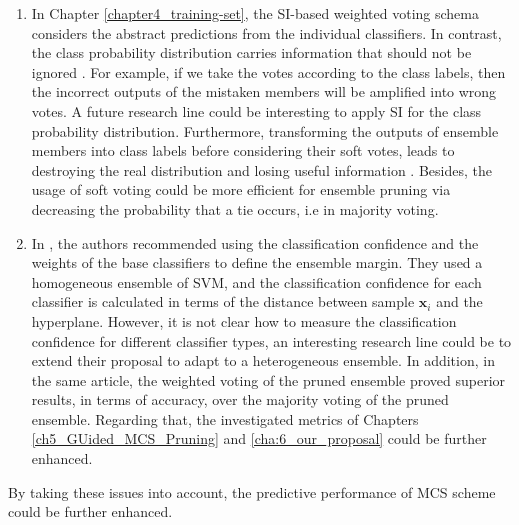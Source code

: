 \begin{enumerate}
    \item In Chapter \ref{chapter4_training-set}, the SI-based weighted voting schema considers the abstract predictions from the individual classifiers. In contrast, the class probability distribution carries information that should not be ignored \cite{sikora2015}. For example, if we take the votes according to the class labels, then the incorrect outputs of the mistaken members will be amplified into wrong votes. A future research line could be interesting to apply SI for the class probability distribution. Furthermore, transforming the outputs of ensemble members into class labels before considering their soft votes, leads to destroying the real distribution and losing useful information \cite{dai2015}.  Besides, the usage of soft voting could be more efficient for ensemble pruning via decreasing the probability that a tie occurs, i.e in majority voting. 
    \item In \cite{li2014}, the authors recommended using the classification confidence and the weights of the base classifiers to define the ensemble margin. They used a homogeneous ensemble of SVM, and the classification confidence for each classifier is calculated in terms of the distance between sample $\textbf{x}_i$ and the hyperplane. However, it is not clear how to measure the classification confidence for different classifier types, an interesting research line could be to extend their proposal to adapt to a heterogeneous ensemble. In addition, in the same article, the weighted voting of the pruned ensemble proved superior results, in terms of accuracy, over the majority voting of the pruned ensemble. Regarding that, the investigated metrics of Chapters \ref{ch5_GUided_MCS_Pruning} and \ref{cha:6_our_proposal} could be further enhanced. 
\end{enumerate}
       

By taking these issues into account, the predictive performance of MCS scheme could be further enhanced.